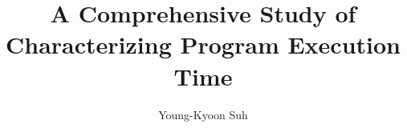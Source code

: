 \documentclass[10pt]{article}
\begin{document}
\title{A Comprehensive Study of Characterizing Program Execution Time}

\author{
Young-Kyoon Suh\\
}
\maketitle

\end{document}
